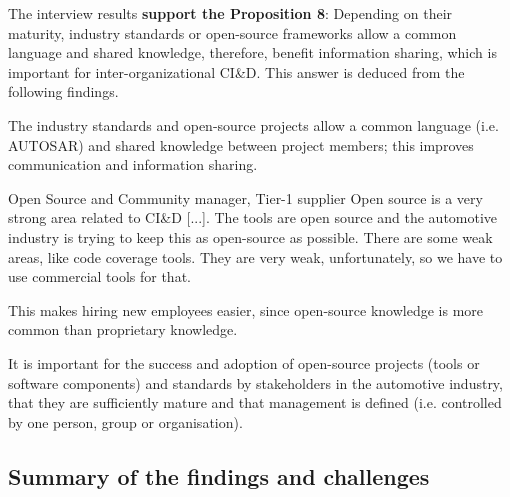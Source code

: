 

The interview results {\bf support the Proposition 8}: Depending on their maturity, industry standards or open-source frameworks allow a common language and shared knowledge, therefore, benefit information sharing, which is important for inter-organizational CI\&D. 
This answer %
is deduced from the following findings.

 The industry standards and open-source projects allow a common language (i.e. AUTOSAR) and shared knowledge between project members; this improves communication and information sharing.

\begin{aquote}{Open Source and Community manager, Tier-1 supplier}
Open source is a very strong area related to CI\&D [...]. The tools are open source and the automotive industry is trying to keep this as open-source as possible. There are some weak areas, like code coverage tools. They are very weak, unfortunately, so we have to use commercial tools for that.
\end{aquote}

This makes hiring new employees easier, since open-source knowledge is more common than proprietary %
knowledge.




 It is important for the success and adoption of open-source projects (tools or software components) and standards by stakeholders in the automotive industry, that they are sufficiently mature and that management is defined (i.e. controlled by one person, group or organisation). 




\subsection{Summary of the findings and challenges}\label{sec:findings_RQs}

